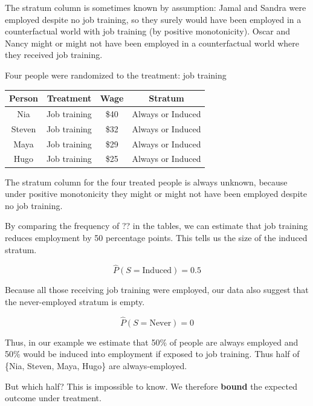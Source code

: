\documentclass[
]{book}
\begin{document}
The stratum column is sometimes known by assumption: Jamal and Sandra were employed despite no job training, so they surely would have been employed in a counterfactual world with job training (by positive monotonicity). Oscar and Nancy might or might not have been employed in a counterfactual world where they received job training.

Four people were randomized to the treatment: job training

\begin{longtable}[]{@{}cccc@{}}
\toprule\noalign{}
Person & Treatment & Wage & Stratum \\
\midrule\noalign{}
\endhead
\bottomrule\noalign{}
\endlastfoot
Nia & Job training & \$40 & Always or Induced \\
Steven & Job training & \$32 & Always or Induced \\
Maya & Job training & \$29 & Always or Induced \\
Hugo & Job training & \$25 & Always or Induced \\
\end{longtable}

The stratum column for the four treated people is always unknown, because under positive monotonicity they might or might not have been employed despite no job training.

By comparing the frequency of ?? in the tables, we can estimate that job training reduces employment by 50 percentage points. This tells us the size of the induced stratum.

\[\hat{P}(S = \text{Induced}) = 0.5\]

Because all those receiving job training were employed, our data also suggest that the never-employed stratum is empty.

\[\hat{P}(S = \text{Never}) = 0\]

Thus, in our example we estimate that 50\% of people are always employed and 50\% would be induced into employment if exposed to job training. Thus half of \{Nia, Steven, Maya, Hugo\} are always-employed.

But which half? This is impossible to know. We therefore \textbf{bound} the expected outcome under treatment.
\end{document}
